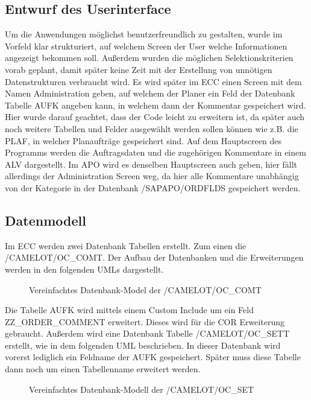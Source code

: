 \subsection{Entwurf des Userinterface}
\label{sec:Benutzeroberflaeche} 
Um die Anwendungen möglichst benutzerfreundlich zu gestalten, wurde im Vorfeld klar strukturiert, auf welchem Screen der User welche Informationen angezeigt bekommen soll. Außerdem wurden die möglichen Selektionskriterien vorab geplant, damit später keine Zeit mit der Erstellung von unnötigen Datenstrukturen verbraucht wird. Es wird später im \ac{ECC} einen Screen mit dem Namen Administration geben, auf welchem der Planer ein Feld der Datenbank Tabelle AUFK angeben kann, in welchem dann der Kommentar gespeichert wird. Hier wurde darauf geachtet, dass der Code leicht zu erweitern ist, da später auch noch weitere Tabellen und Felder ausgewählt werden sollen können wie z.B. die PLAF, in welcher Planaufträge gespeichert sind. Auf dem Hauptscreen des Programms werden die Auftragsdaten und die zugehörigen Kommentare in einem \ac{ALV} dargestellt. Im \ac{APO} wird es denselben Hauptscreen auch geben, hier fällt allerdings der Administration Screen weg, da hier alle Kommentare unabhängig von der Kategorie in der Datenbank /SAPAPO/ORDFLDS gespeichert werden. 

\subsection{Datenmodell}
\label{sec:Datenmodell}
Im ECC werden zwei Datenbank Tabellen erstellt. Zum einen die /CAMELOT/OC\_COMT. Der Aufbau der Datenbanken und die Erweiterungen werden in den folgenden \ac{UML}s dargestellt.

\begin{figure}[htb]
\centering
{}
\caption{Vereinfachtes Datenbank-Model der /CAMELOT/OC\_COMT}
\label{fig:ECC01}
\end{figure} 

Die Tabelle AUFK wird mittels einem Custom Include um ein Feld ZZ\_ORDER\_COMMENT erweitert. Dieses wird für die COR Erweiterung gebraucht. Außerdem wird eine Datenbank Tabelle /CAMELOT/OC\_SETT erstellt, wie in dem folgenden \ac{UML} beschrieben. In dieser Datenbank wird vorerst lediglich ein Feldname der AUFK gespeichert. Später muss diese Tabelle dann noch um einen Tabellenname erweitert werden.

\begin{figure}[htb]
	\centering
	\caption{Vereinfachtes Datenbank-Modell der /CAMELOT/OC\_SET}
	\label{fig:ECC02}
\end{figure} 

